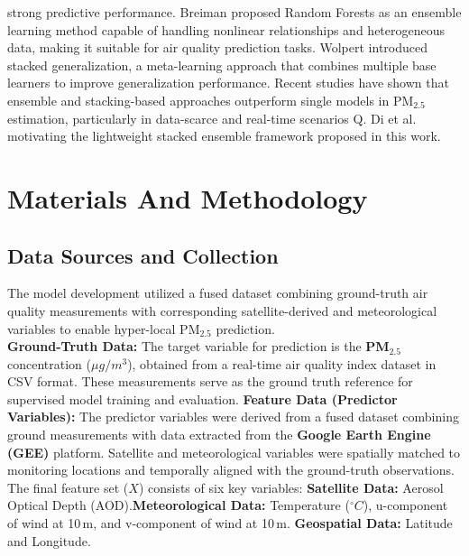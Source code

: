 \documentclass[conference]{IEEEtran}
\begin{document}
strong predictive performance. Breiman \cite{b13} proposed Random Forests as an ensemble learning method capable of handling nonlinear relationships and heterogeneous data, making it suitable for air quality prediction tasks. Wolpert \cite{b14} introduced stacked generalization, a meta-learning approach that combines multiple base learners to improve generalization performance. Recent studies have shown that ensemble and stacking-based approaches outperform single models in PM$_{2.5}$ estimation, particularly in data-scarce and real-time scenarios Q. Di et al.\cite{b15} motivating the lightweight stacked ensemble framework proposed in this work.


\section{Materials And Methodology}
\label{sec:methodology}

\subsection{Data Sources and Collection}
The model development utilized a fused dataset combining ground-truth air quality measurements with corresponding satellite-derived and meteorological variables to enable hyper-local PM$_{2.5}$ prediction.\\ \textbf{Ground-Truth Data:}
The target variable for prediction is the \textbf{PM$_{2.5}$} concentration ($\mu g/m^3$), obtained from a real-time air quality index dataset in CSV format. These measurements serve as the ground truth reference for supervised model training and evaluation.\newline
\textbf{Feature Data (Predictor Variables):}
The predictor variables were derived from a fused dataset combining ground measurements with data extracted from the \textbf{Google Earth Engine (GEE)} platform. Satellite and meteorological variables were spatially matched to monitoring locations and temporally aligned with the ground-truth observations. The final feature set ($X$) consists of six key variables:
\newline \textbf{Satellite Data:} Aerosol Optical Depth (AOD).\newline \textbf{Meteorological Data:} Temperature ($^{\circ}C$), u-component of wind at 10\,m, and v-component of wind at 10\,m. \newline \textbf{Geospatial Data:} Latitude and Longitude.
\end{document}
